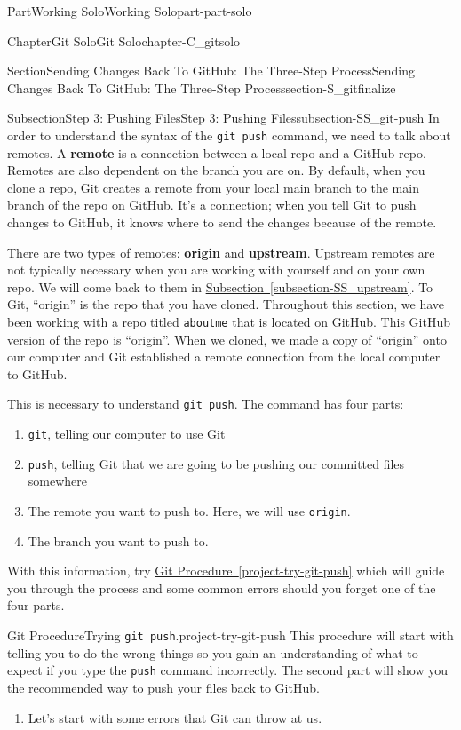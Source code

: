 \documentclass[oneside,10pt,]{book}
\newcommand{\xreffont}{\relax}
\newcommand{\mono}[1]{\texttt{#1}}
\newcommand{\terminology}[1]{\textbf{#1}}
\begin{document}
\begin{partptx}{Part}{Working Solo}{}{Working Solo}{}{}{part-part-solo}
\begin{chapterptx}{Chapter}{Git Solo}{}{Git Solo}{}{}{chapter-C_gitsolo}
\begin{sectionptx}{Section}{Sending Changes Back To GitHub: The Three-Step Process}{}{Sending Changes Back To GitHub: The Three-Step Process}{}{}{section-S_gitfinalize}
\begin{subsectionptx}{Subsection}{Step 3: Pushing Files}{}{Step 3: Pushing Files}{}{}{subsection-SS_git-push}
In order to understand the syntax of the \mono{git push} command, we need to talk about remotes. A \terminology{remote} is a connection between a local repo and a GitHub repo. Remotes are also dependent on the branch you are on. By default, when you clone a repo, Git creates a remote from your local main branch to the main branch of the repo on GitHub. It's a connection; when you tell Git to push changes to GitHub, it knows where to send the changes because of the remote.%
\par
There are two types of remotes: \terminology{origin} and \terminology{upstream}. Upstream remotes are not typically necessary when you are working with yourself and on your own repo. We will come back to them in \hyperref[subsection-SS_upstream]{Subsection~{\xreffont\ref{subsection-SS_upstream}}}. To Git, ``origin'' is the repo that you have cloned. Throughout this section, we have been working with a repo titled \mono{aboutme} that is located on GitHub. This GitHub version of the repo is ``origin''. When we cloned, we made a copy of ``origin'' onto our computer and Git established a remote connection from the local computer to GitHub.%
\par
This is necessary to understand \mono{git push}. The command has four parts:%
\begin{enumerate}
\item{}\mono{git}, telling our computer to use Git%
\item{}\mono{push}, telling Git that we are going to be pushing our committed files somewhere%
\item{}The remote you want to push to. Here, we will use \mono{origin}.%
\item{}The branch you want to push to.%
\end{enumerate}
With this information, try \hyperref[project-try-git-push]{Git Procedure~{\xreffont\ref{project-try-git-push}}} which will guide you through the process and some common errors should you forget one of the four parts.%
\begin{project}{Git Procedure}{Trying \mono{git push}.}{project-try-git-push}%
This procedure will start with telling you to do the wrong things so you gain an understanding of what to expect if you type the \mono{push} command incorrectly. The second part will show you the recommended way to push your files back to GitHub.%
\begin{enumerate}[font=\bfseries,label=(\alph*),ref=\alph*]%
\item{}Let's start with some errors that Git can throw at us.%

\end{enumerate}
\end{project}
\end{subsectionptx}
\end{sectionptx}
\end{chapterptx}
\end{partptx}
\end{document}

